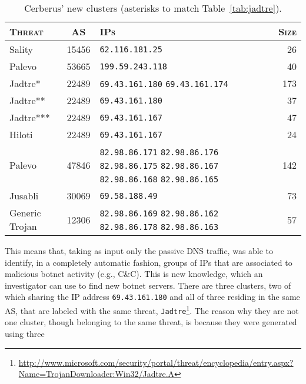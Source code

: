 \begin{table}[!htp]
\centering
\begin{tabular}{lcp{3cm}r}
\toprule
\textsc{Threat} & \textsc{AS} & \textsc{IPs} & \textsc{Size} \\
\midrule
Sality & 15456  & \texttt{62.116.181.25} & 26 \\
Palevo & 53665  & \texttt{199.59.243.118} & 40 \\
Jadtre* & 22489  & \texttt{69.43.161.180} \newline \texttt{69.43.161.174} & 173 \\
Jadtre** & 22489  & \texttt{69.43.161.180} & 37 \\
Jadtre*** & 22489  & \texttt{69.43.161.167} & 47 \\
Hiloti & 22489  & \texttt{69.43.161.167} & 24 \\
Palevo & 47846  & \texttt{82.98.86.171} \newline \texttt{82.98.86.176} \newline \texttt{82.98.86.175}
\newline \texttt{82.98.86.167} \newline \texttt{82.98.86.168} \newline \texttt{82.98.86.165}
& 142 \\
Jusabli & 30069 & \texttt{69.58.188.49} & 73 \\
Generic Trojan & 12306 & \texttt{82.98.86.169} \newline \texttt{82.98.86.162} \newline \texttt{82.98.86.178}
\newline \texttt{82.98.86.163} &  57 \\
\bottomrule
\end{tabular}
\caption{Cerberus' new clusters (asterisks to match Table~\ref{tab:jadtre}).}
\label{tab:clusters}
\end{table}
This means that, taking as input only the
passive DNS traffic, \thesystem was able to identify, in a completely
automatic fashion, groups of IPs that are associated to malicious botnet
activity (e.g., C\&C). This is new knowledge, which an investigator can use to
find new botnet servers.
There are three clusters, two of which
sharing the IP address \texttt{69.43.161.180} and all of three residing in the same
AS, that are labeled with the same threat, \texttt{Jadtre}\footnote{\url{http://www.microsoft.com/security/portal/threat/encyclopedia/entry.aspx?Name=TrojanDownloader:Win32/Jadtre.A}}. The reason why they are not one cluster,
though belonging to the same threat, is because they were generated using three
